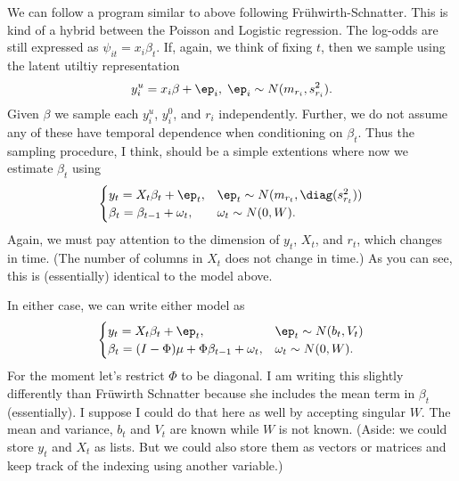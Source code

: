 \documentclass{article}
\begin{document}
We can follow a program similar to above following Fr\"{u}hwirth-Schnatter.
This is kind of a hybrid between the Poisson and Logistic regression.  The
log-odds are still expressed as $\psi_{it} = x_i \beta_t$.  If, again, we think
of fixing $t$, then we sample using the latent utiltiy representation
\[
y_{i}^u = x_i \beta + \ep_{i}, \; \ep_i \sim N(m_{r_i}, s_{r_i}^2).
\]
Given $\beta$ we sample each $y_i^u$, $y_{i}^0$, and $r_i$ independently.
Further, we do not assume any of these have temporal dependence when
conditioning on $\beta_t$.  Thus the sampling procedure, I think, should be a
simple extentions where now we estimate $\beta_t$ using
\[
\begin{cases}
y_t = X_t \beta_t + \ep_t, & \ep_t \sim N(m_{r_t}, \diag(s_{r_t}^2)) \\
\beta_t = \beta_{t-1} + \omega_t, & \omega_t \sim N(0, W).
\end{cases}
\]
Again, we must pay attention to the dimension of $y_t$, $X_t$, and $r_t$, which
changes in time.  (The number of columns in $X_t$ does not change in time.)  As
you can see, this is (essentially) identical to the model above.

In either case, we can write either model as
\[
\begin{cases}
y_t = X_t \beta_t + \ep_t, & \ep_t \sim N(b_t, V_t) \\
\beta_t = (I-\Phi)\mu + \Phi \beta_{t-1} + \omega_t, & \omega_t \sim N(0, W).
\end{cases}
\]
For the moment let's restrict $\Phi$ to be diagonal.  I am writing this slightly
differently than Fr\"{u}wirth Schnatter because she includes the mean term in
$\beta_t$ (essentially).  I suppose I could do that here as well by accepting
singular $W$.  The mean and variance, $b_t$ and $V_t$ are known while $W$ is not
known.  (Aside: we could store $y_t$ and $X_t$ as lists.  But we could also
store them as vectors or matrices and keep track of the indexing using another
variable.)
\end{document}
